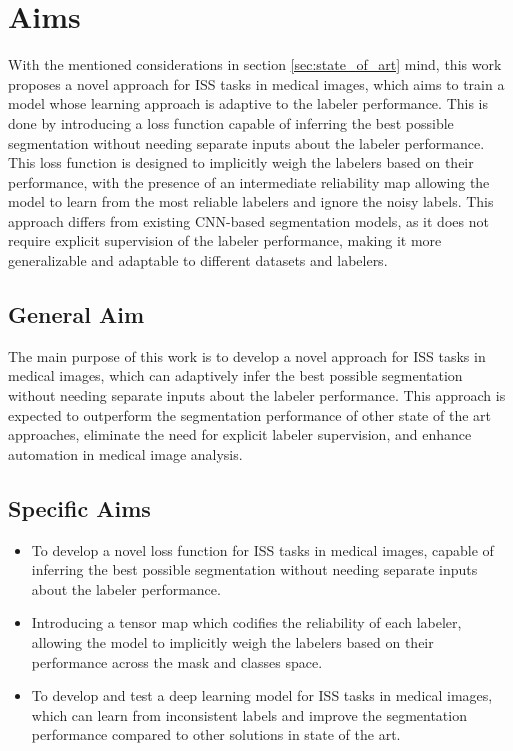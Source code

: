 
\section{Aims}\label{sec:objectives}

With the mentioned considerations in section \ref{sec:state_of_art}
mind, this work proposes a novel approach for \gls{ISS} tasks in
medical images, which aims to train a model whose learning approach
is adaptive to the labeler performance. This is done by introducing a
loss function capable of inferring the best possible segmentation
without needing separate inputs about the labeler performance. This
loss function is designed to implicitly weigh the labelers based on
their performance, with the presence of an intermediate reliability
map allowing the model to learn from the most reliable labelers and
ignore the noisy labels. This approach differs from existing
\gls{CNN}-based segmentation models, as it does not require explicit
supervision of the labeler performance, making it more generalizable
and adaptable to different datasets and labelers.
\subsection{General Aim}

The main purpose of this work is to develop a novel approach for
\gls{ISS} tasks in medical images, which can adaptively infer the best
possible segmentation without needing separate inputs about the
labeler performance. This approach is expected to outperform the
segmentation performance of other state of the art approaches,
eliminate the need for explicit labeler supervision, and enhance
automation in medical image analysis.

\subsection{Specific Aims}

\begin{itemize}

  \item To develop a novel loss function for \gls{ISS} tasks in
    medical images, capable of inferring the best possible
    segmentation without needing separate inputs about the labeler
    performance.

  \item Introducing a tensor map which codifies the reliability of
    each labeler, allowing the model to implicitly weigh the labelers
    based on their performance across the mask and classes space.

  \item To develop and test a deep learning model for \gls{ISS} tasks
    in medical images, which can learn from inconsistent labels and
    improve the segmentation performance compared to other solutions
    in state of the art.

\end{itemize}
